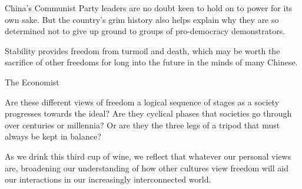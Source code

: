 {  China's Communist Party leaders are no doubt keen to hold on to power for its
  own sake. But the country's grim history also helps explain why they are so
  determined not to give up ground to groups of pro-democracy demonstrators.

  Stability provides freedom from turmoil and death, which may be worth the
  sacrifice of other freedoms for long into the future in the minds of many
  Chinese.

  \textemdash{}The Economist

  \newReading Are these different views of freedom a logical sequence of stages
  as a society progresses towards the ideal? Are they cyclical phases that
  societies go through over centuries or millennia? Or are they the three legs
  of a tripod that must always be kept in balance?

  As we drink this third cup of wine, we reflect that whatever our personal
  views are, broadening our understanding of how other cultures view freedom
  will aid our interactions in our increasingly interconnected world.
}


